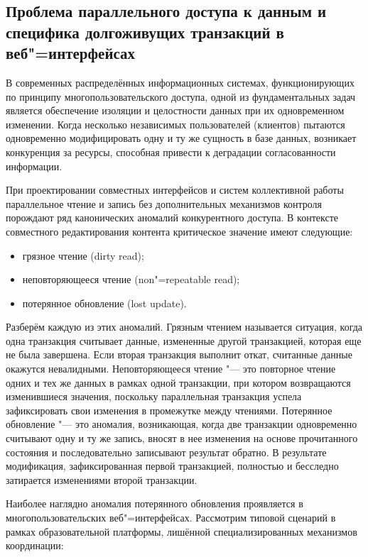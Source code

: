 \documentclass[coursework]{SCWorks}
\begin{document}
\subsection{Проблема параллельного доступа к данным и специфика долгоживущих транзакций в веб"=интерфейсах}

В современных распределённых информационных системах, функционирующих по принципу многопользовательского доступа, одной из фундаментальных задач является обеспечение изоляции и целостности данных при их одновременном изменении. Когда несколько независимых пользователей (клиентов) пытаются одновременно модифицировать одну и ту же сущность в базе данных, возникает конкуренция за ресурсы, способная привести к деградации согласованности информации.

При проектировании совместных интерфейсов и систем коллективной работы параллельное чтение и запись без дополнительных механизмов контроля порождают ряд канонических аномалий конкурентного доступа. В контексте совместного редактирования контента критическое значение имеют следующие:

\begin{itemize}
  \item грязное чтение (dirty read);
  \item неповторяющееся чтение (non"=repeatable read);
  \item потерянное обновление (lost update).
\end{itemize}

Разберём каждую из этих аномалий. 
Грязным чтением называется ситуация, когда одна транзакция считывает данные, измененные другой транзакцией, которая еще не была завершена. Если вторая транзакция выполнит откат, считанные данные окажутся невалидными.
Неповторяющееся чтение "--- это повторное чтение одних и тех же данных в рамках одной транзакции, при котором возвращаются изменившиеся значения, поскольку параллельная транзакция успела зафиксировать свои изменения в промежутке между чтениями.
Потерянное обновление "--- это аномалия, возникающая, когда две транзакции одновременно считывают одну и ту же запись, вносят в нее изменения на основе прочитанного состояния и последовательно записывают результат обратно. В результате модификация, зафиксированная первой транзакцией, полностью и бесследно затирается изменениями второй транзакции.

Наиболее наглядно аномалия потерянного обновления проявляется в многопользовательских веб"=интерфейсах. Рассмотрим типовой сценарий в рамках образовательной платформы, лишённой специализированных механизмов координации:
\end{document}
